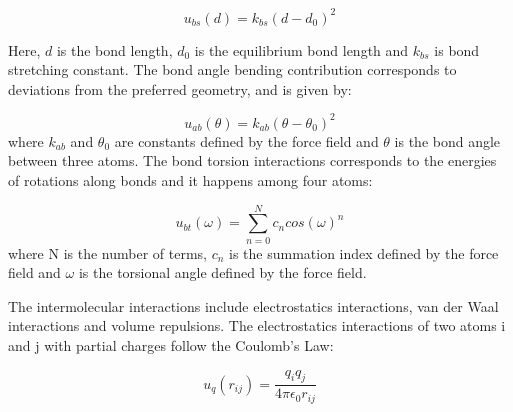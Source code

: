 \begin{equation}
u_{bs}(d) = k_{bs} (d - d_{0})^2
\end{equation}

Here, $d$ is the bond length, $d_{0}$ is the equilibrium bond length and $k_{bs}$ is bond stretching constant. The bond angle bending contribution corresponds to deviations from the preferred geometry, and is given by:

\begin{equation}
u_{ab}(\theta) = k_{ab} (\theta - \theta _{0})^2
\end{equation}
where $k_{ab}$ and $\theta _{0}$ are constants defined by the force field and $\theta$ is the bond angle between three atoms.  The bond torsion interactions corresponds to the energies of rotations along bonds and it happens among four atoms:

\begin{equation}
u_{bt}(\omega) = \sum_{n=0}^{N}  c_{n} cos(\omega) ^{n}
\end{equation}
where N is the number of terms, $c_{n}$ is the summation index defined by the force field and $\omega$ is the torsional angle defined by the force field. 

The intermolecular interactions include electrostatics interactions, van der Waal interactions and volume repulsions. The electrostatics interactions of two atoms i and j with partial charges follow the Coulomb's Law:

\begin{equation}
u_{q}(r_{ij}) = \frac{q_{i}q_{j}}{4 \pi \epsilon _{0} r_{ij}}
\end{equation} 

